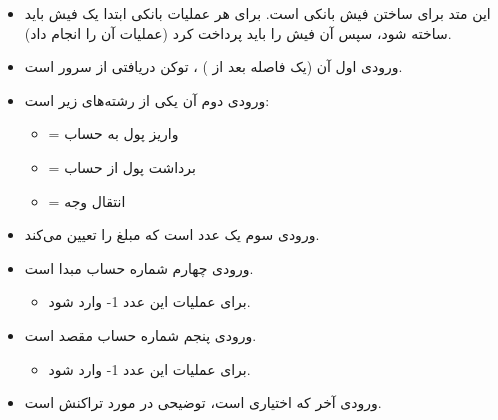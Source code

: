 \documentclass[]{article}
\begin{document}
\begin{itemize}




\item
این متد برای ساختن فیش بانکی است. برای هر عملیات بانکی ابتدا یک فیش باید ساخته شود، سپس آن فیش را باید پرداخت کرد (عملیات آن را انجام داد).

\item
\textcolor{CustomColor}{ورودی} اول آن (یک فاصله بعد از ‌) ، توکن دریافتی از سرور است.

\item
\textcolor{CustomColor}{ورودی} دوم آن یکی از رشته‌های زیر است:

\begin{itemize}

\item
{}  = واریز پول به حساب
\item
{}  = برداشت پول از حساب
\item
{}  = انتقال وجه

\end{itemize}

\item
\textcolor{CustomColor}{ورودی} سوم یک عدد است که مبلغ را تعیین می‌کند.

\item
\textcolor{CustomColor}{ورودی} چهارم شماره حساب مبدا است. 
\begin{itemize}
\item
برای عملیات  این عدد 1- وارد شود.
\end{itemize}


\item
\textcolor{CustomColor}{ورودی} پنجم شماره حساب مقصد است.
\begin{itemize}
\item
برای عملیات  این عدد 1- وارد شود.
\end{itemize}
\item
\textcolor{CustomColor}{ورودی} آخر که اختیاری است، توضیحی در مورد تراکنش است.


\end{itemize}
\end{document}
